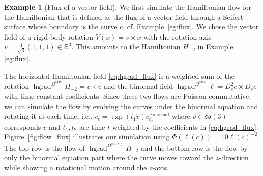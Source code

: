 \documentclass[12pt]{amsart}
\newcommand{\rev}[1]{#1}
\theoremstyle{definition}
\newtheorem{example}[theorem]{Example}
\newcommand{\R}{\mathbb R}
\newcommand{\OmMW}{\Omega^{\operatorname{MW}}}
\def\Om{\Omega}
\def\x{\times}
\def\R{{\mathbb R}}
\def\exp{\operatorname{exp}}
\let\on=\operatorname
\begin{document}
\begin{example}[Flux of a vector field]
We first simulate the Hamiltonian flow for the Hamiltonian that is defined as the flux of a vector field through a Seifert surface whose boundary is the curve $c$, cf. Example~\ref{eg:flux}. We chose the vector field of a rigid body rotation $V(x)=v\x x$ with the rotation axis $v=\frac{1}{\sqrt{3}}(1,1,1) \in \R^3$. This amounts to the Hamiltonian $H_{-2}$ in Example \ref{eg:flux}. 

The horizontal Hamiltonian field \eqref{eq:hgrad_flux} is a weighted sum of the rotation $\on{hgrad}^{\OmMW}H_{-2}=v\x c$ and the binormal field $\on{hgrad}^{\OmMW}\ell=D_s^2 c\x D_s c$ with time-constant coefficients. Since these two flows are Poisson commutative, we can simulate the flow by evolving the curves under the binormal equation and rotating it at each time, i.e., $c_t=\exp(t_1 \hat v) c_{t_2}^{\on{Binormal}}$ where $\hat v\in \mathfrak{so}(3)$ corresponds $v$ and $t_1, t_2$ are time $t$ weighted by the coefficients in \eqref{eq:hgrad_flux}. Figure~\ref{fig:flow_flux} illustrates our simulation using $\Phi(\ell\rev{(c)})=10\ell\rev{(c)}^{-2}$. 
The top row is the flow of  $\on{hgrad}^{\Om^{\Phi(\ell)}}H_{-2}$ and the bottom row is the flow by only the binormal equation part where the curve moves toward the $z$-direction while showing a rotational motion around the $z$-axis.
\end{example}
\end{document}

